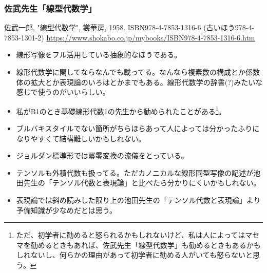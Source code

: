 \documentclass[10pt,a4paper]{jsarticle}
\begin{document}
\subsubsection*{佐武先生「線型代数学」}
佐武一郎, "線型代数学", 裳華房, 1958. ISBN978-4-7853-1316-6 (古いほう978-4-7853-1301-2) \url{https://www.shokabo.co.jp/mybooks/ISBN978-4-7853-1316-6.htm}
\begin{itemize}
    \item 線形写像をフル活用している抽象的なほうである。
    \item 線形代数学に関してならなんでも載ってる。なんなら複素数の構成とか係数体の拡大とか表現論のいろはとかまでもある。線形代数学の辞書(?)みたいな感じで使うのがいいらしい。
    \item 私がB1のとき基礎線形代数1の先生から勧められたことがある\footnote{ただ、初学者に勧めると怒られるかもしれないけど、私は人によってはマセマを勧めるときもあれば、佐武先生「線型代数学」も勧めるときもあるかもしれないし、何らかの理由があって初学者に勧める人がいても怒らないと思う。}。
    \item ブルバキスタイルでない箇所がちらほらあって人によっては分かったふりになりやすくて結構難しいかもしれない。
    \item ジョルダン標準形では冪零変換の流儀をとっている。
    \item テンソルも外積代数も扱ってる。ただカノニカルな線形同型写像の記述が池田先生の「テンソル代数と表現論」と比べたら分かりにくいかもしれない。
    \item 表現論では斜め読みした限り上の池田先生の「テンソル代数と表現論」より予備知識が少なめだとは思う。
\end{itemize}
\end{document}
